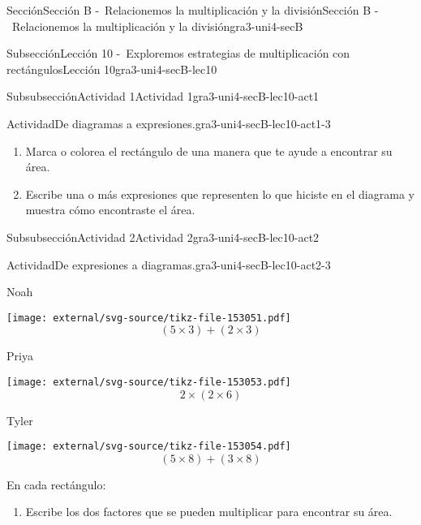 \documentclass[twoside,10pt,]{article}
\begin{document}
\begin{sectionptx}{Sección}{Sección B -~Relacionemos la multiplicación y la división}{}{Sección B -~Relacionemos la multiplicación y la división}{}{}{gra3-uni4-secB}
\begin{subsectionptx}{Subsección}{Lección 10 -~Exploremos estrategias de multiplicación con rectángulos}{}{Lección 10}{}{}{gra3-uni4-secB-lec10}
\begin{subsubsectionptx}{Subsubsección}{Actividad 1}{}{Actividad 1}{}{}{gra3-uni4-secB-lec10-act1}
\begin{activity}{Actividad}{De diagramas a expresiones.}{gra3-uni4-secB-lec10-act1-3}
\begin{enumerate}
%
\begin{enumerate}
\item{}Marca o colorea el rectángulo de una manera que te ayude a encontrar su área.%
\item{}Escribe una o más expresiones que representen lo que hiciste en el diagrama y muestra cómo encontraste el área.%
\end{enumerate}
%
\end{enumerate}
\end{activity}%
\end{subsubsectionptx}
%
%
\typeout{************************************************}
\typeout{************************************************}
%
\begin{subsubsectionptx}{Subsubsección}{Actividad 2}{}{Actividad 2}{}{}{gra3-uni4-secB-lec10-act2}
\begin{activity}{Actividad}{De expresiones a diagramas.}{gra3-uni4-secB-lec10-act2-3}%
\begin{sidebyside}{3}{0.0166666666666667}{0.0166666666666667}{0.0333333333333333}%
\begin{sbspanel}{0.3}%
Noah%
\par
\texttt{[image: external/svg-source/tikz-file-153051.pdf]}
%
\begin{equation*}
(5\times 3)+(2 \times 3)
\end{equation*}
%
\end{sbspanel}%
\begin{sbspanel}{0.3}%
Priya%
\par
\texttt{[image: external/svg-source/tikz-file-153053.pdf]}
%
\begin{equation*}
2 \times (2 \times 6)
\end{equation*}
%
\end{sbspanel}%
\begin{sbspanel}{0.3}%
Tyler%
\par
\texttt{[image: external/svg-source/tikz-file-153054.pdf]}
%
\begin{equation*}
(5 \times 8) + (3 \times 8)
\end{equation*}
%
\end{sbspanel}%
\end{sidebyside}%
\par
En cada rectángulo:%
%
\begin{enumerate}
\item{}Escribe los dos factores que se pueden multiplicar para encontrar su área.%

\end{enumerate}
\end{activity}
\end{subsubsectionptx}
\end{subsectionptx}
\end{sectionptx}
\end{document}
